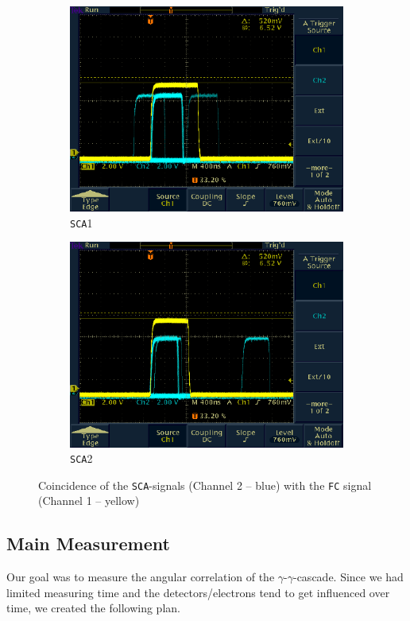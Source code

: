 \documentclass[11pt,a4paper,notitlepage]{scrartcl}
\begin{document}
\begin{figure}[H]
	\centering
	\begin{subfigure}{0.49\linewidth}
		\includegraphics[width=\linewidth]{figs/osci_pics/UC1.pdf}
		\caption{\texttt{SCA}1}
	\end{subfigure}
	\begin{subfigure}{0.49\linewidth}
		\includegraphics[width=\linewidth]{figs/osci_pics/UC2.pdf}
		\caption{\texttt{SCA}2}
	\end{subfigure}
	\caption{Coincidence of the \texttt{SCA}-signals (Channel 2 -- blue) with the \texttt{FC} signal (Channel 1 -- yellow)}\label{fig:universal_coincidence}
\end{figure}
\subsection{Main Measurement}
Our goal was to measure the angular correlation of the $\gamma$-$\gamma$-cascade. Since we had limited measuring time and the detectors/electrons tend to get influenced over time, we created the following plan. 
\end{document}
